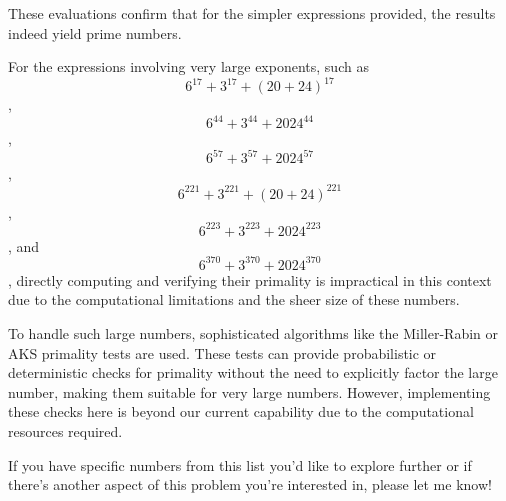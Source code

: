 \documentclass[a4paper]{article}
\begin{document}
These evaluations confirm that for the simpler expressions provided, the results indeed yield prime numbers.

For the expressions involving very large exponents, such as \begin{equation}6^{17} + 3^{17} + (20+24)^{17}\end{equation}, \begin{equation}6^{44} + 3^{44} + 2024^{44}\end{equation}, \begin{equation}6^{57} + 3^{57} + 2024^{57}\end{equation}, \begin{equation}6^{221} + 3^{221} + (20+24)^{221}\end{equation}, \begin{equation}6^{223} + 3^{223} + 2024^{223}\end{equation}, and \begin{equation}6^{370} + 3^{370} + 2024^{370}\end{equation}, directly computing and verifying their primality is impractical in this context due to the computational limitations and the sheer size of these numbers.

To handle such large numbers, sophisticated algorithms like the Miller-Rabin or AKS primality tests are used. These tests can provide probabilistic or deterministic checks for primality without the need to explicitly factor the large number, making them suitable for very large numbers. However, implementing these checks here is beyond our current capability due to the computational resources required.

If you have specific numbers from this list you'd like to explore further or if there's another aspect of this problem you're interested in, please let me know!
\end{document}
